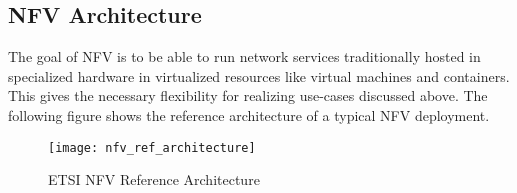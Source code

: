 \subsection{NFV Architecture}

The goal of NFV  is to be able to run network services traditionally hosted in specialized hardware in virtualized resources like virtual machines and containers. This gives the necessary flexibility for realizing use-cases discussed above.  The following figure shows the reference architecture of a typical NFV deployment. 

\begin{figure}
	\centering
	\texttt{[image: nfv\_ref\_architecture]}
	\label{fig:figure5}
	\caption{ETSI NFV Reference Architecture}
\end{figure}
